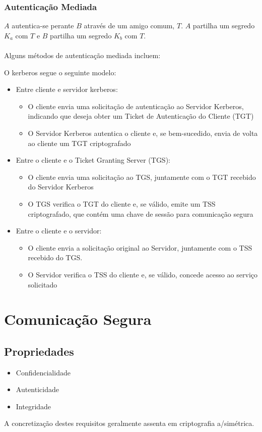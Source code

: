 \documentclass[10pt,a4paper]{report}
\begin{document}
\subsubsection{Autenticação Mediada}
$A$ autentica-se perante $B$ através de um amigo comum, $T$. $A$ partilha um segredo $K_a$ com $T$ e $B$ partilha um segredo $K_b$ com $T$.\\
\\
Alguns métodos de autenticação mediada incluem:
\begin{figure}[H]
\centering
{}%
\end{figure}
O kerberos segue o seguinte modelo:
\begin{itemize}
\item Entre cliente e servidor kerberos:
\begin{itemize}
\item  O cliente envia uma solicitação de autenticação ao Servidor Kerberos, indicando que deseja obter um Ticket de Autenticação do Cliente (TGT)
\item O Servidor Kerberos autentica o cliente e, se bem-sucedido, envia de volta ao cliente um TGT criptografado
\end{itemize}
\item Entre o cliente e o Ticket Granting Server (TGS):
\begin{itemize}
\item O cliente envia uma solicitação ao TGS, juntamente com o TGT recebido do Servidor Kerberos
\item O TGS verifica o TGT do cliente e, se válido, emite um TSS criptografado, que contém uma chave de sessão para comunicação segura
\end{itemize}
\item Entre o cliente e o servidor:
\begin{itemize}
\item O cliente envia a solicitação original ao Servidor, juntamente com o TSS recebido do TGS.
\item O Servidor verifica o TSS do cliente e, se válido, concede acesso ao serviço solicitado
\end{itemize}
\end{itemize}
\section{Comunicação Segura}
\subsection{Propriedades}
\begin{itemize}
\item Confidencialidade
\item Autenticidade
\item Integridade
\end{itemize}
A concretização destes requisitos geralmente assenta em criptografia a/simétrica.
\end{document}
